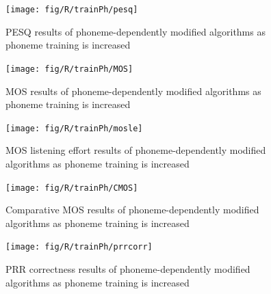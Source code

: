 \begin{figure}[p]
\noindent \begin{centering}
\texttt{[image: fig/R/trainPh/pesq]}
\par\end{centering}

\protect\caption{\label{fig:vary-train-phn-pesq}\acs{PESQ} results of phoneme-dependently
modified algorithms as phoneme training is increased}
\end{figure}


\begin{figure}[p]
\noindent \begin{centering}
\texttt{[image: fig/R/trainPh/MOS]}
\par\end{centering}

\protect\caption{\label{fig:vary-train-phn-mos}\acs{MOS} results of phoneme-dependently
modified algorithms as phoneme training is increased}
\end{figure}


\begin{figure}[p]
\noindent \begin{centering}
\texttt{[image: fig/R/trainPh/mosle]}
\par\end{centering}

\protect\caption{\label{fig:vary-train-phn-mosle}\acs{MOS} listening effort results
of phoneme-dependently modified algorithms as phoneme training is
increased}
\end{figure}


\begin{figure}[p]
\noindent \begin{centering}
\texttt{[image: fig/R/trainPh/CMOS]}
\par\end{centering}

\protect\caption{\label{fig:vary-train-phn-cmos}Comparative \acs{MOS} results of
phoneme-dependently modified algorithms as phoneme training is increased}
\end{figure}


\begin{figure}[p]
\noindent \begin{centering}
\texttt{[image: fig/R/trainPh/prrcorr]}
\par\end{centering}

\protect\caption{\label{fig:vary-train-phn-prrcorr} \acs{PRR} correctness results
of phoneme-dependently modified algorithms as phoneme training is
increased}
\end{figure}


